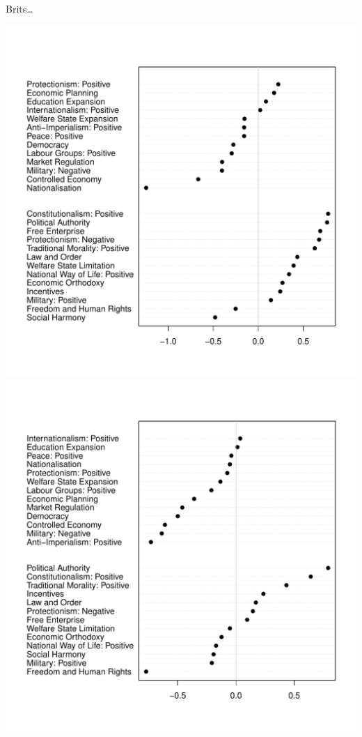 \documentclass{hertieteaching}
\begin{document}
\begin{frame}{Brits\ldots}

\centerline{\includegraphics[scale=0.4]{pictures/UK_items}\pause \includegraphics[scale=0.4]{pictures/UK_items_only_main_parties}}
\end{frame}
\end{document}
